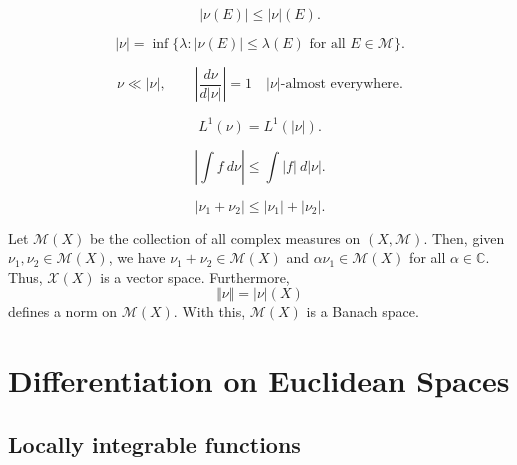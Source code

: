 \documentclass[11pt]{article}
\newcommand{\C}{\mathbb{C}}
\newcommand{\M}{\mathcal{M}}
\theoremstyle{definition}
\theoremstyle{remark}
\begin{document}
    \begin{lemma}
        \[
            |\nu(E)| \leq |\nu|(E).
        \]
    \end{lemma}

    \begin{lemma}
        \[
            |\nu| = \inf\{\lambda : |\nu(E)| \leq \lambda(E) \text{ for all } E \in
            \M\}.
        \]
    \end{lemma}

    \begin{lemma}
        \[
            \nu \ll |\nu|, \qquad
            \left|\frac{d\nu}{d|\nu|}\right| = 1\quad|\nu|\text{-almost everywhere}.
        \]
    \end{lemma}

    \begin{lemma}
        \[
            L^1(\nu) = L^1(|\nu|).
        \]
    \end{lemma}

    \begin{lemma}
        \[
            |\int f\:d\nu| \leq \int |f|\:d|\nu|.
        \]
    \end{lemma}

    \begin{lemma}
        \[
            |\nu_1 + \nu_2| \leq |\nu_1| + |\nu_2|.
        \]
    \end{lemma}


    \begin{theorem}
        Let $\mathscr{M}(X)$ be the collection of all complex measures on $(X, \M)$.
        Then, given $\nu_1, \nu_2 \in \mathscr{M}(X)$, we have $\nu_1 + \nu_2 \in
        \mathscr{M}(X)$ and $\alpha\nu_1 \in \mathscr{M}(X)$ for all $\alpha \in \C$.
        Thus, $\mathscr{X}(X)$ is a vector space. Furthermore, \[
            \Vert \nu\Vert = |\nu|(X)
        \] defines a norm on $\mathscr{M}(X)$. With this, $\mathscr{M}(X)$ is a
        Banach space.
    \end{theorem}



    \section{Differentiation on Euclidean Spaces}


    \subsection{Locally integrable functions}
\end{document}
